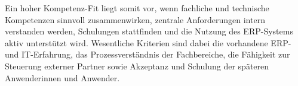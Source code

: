 Ein hoher Kompetenz-Fit liegt somit vor, wenn fachliche und technische Kompetenzen sinnvoll zusammenwirken, zentrale Anforderungen intern 
verstanden werden, Schulungen stattfinden und die Nutzung des ERP-Systems aktiv unterstützt wird. Wesentliche Kriterien sind dabei 
die vorhandene ERP- und IT-Erfahrung, das Prozessverständnis der Fachbereiche, die Fähigkeit zur Steuerung externer Partner sowie 
Akzeptanz und Schulung der späteren Anwenderinnen und Anwender.
